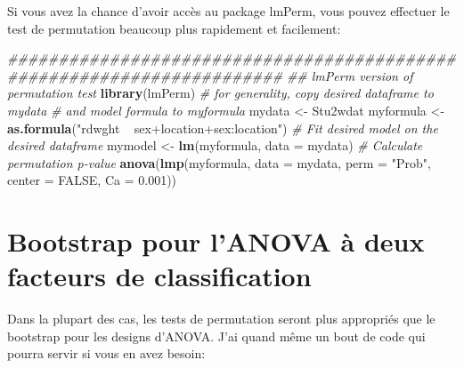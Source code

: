 \documentclass[12pt,]{book}
\newenvironment{Shaded}{\begin{snugshade}}{\end{snugshade}}
\newcommand{\CommentTok}[1]{\textcolor[rgb]{0.56,0.35,0.01}{\textit{#1}}}
\newcommand{\DataTypeTok}[1]{\textcolor[rgb]{0.13,0.29,0.53}{#1}}
\newcommand{\FloatTok}[1]{\textcolor[rgb]{0.00,0.00,0.81}{#1}}
\newcommand{\KeywordTok}[1]{\textcolor[rgb]{0.13,0.29,0.53}{\textbf{#1}}}
\newcommand{\NormalTok}[1]{#1}
\newcommand{\OtherTok}[1]{\textcolor[rgb]{0.56,0.35,0.01}{#1}}
\newcommand{\StringTok}[1]{\textcolor[rgb]{0.31,0.60,0.02}{#1}}
\begin{document}
Si vous avez la chance d'avoir accès au package lmPerm, vous pouvez effectuer le test de permutation beaucoup plus rapidement et facilement:

\begin{Shaded}
\begin{Highlighting}[]
\CommentTok{#######################################################################}
\CommentTok{## lmPerm version of permutation test}
\KeywordTok{library}\NormalTok{(lmPerm)}
\CommentTok{# for generality, copy desired dataframe to mydata}
\CommentTok{# and model formula to myformula}
\NormalTok{mydata <-}\StringTok{ }\NormalTok{Stu2wdat}
\NormalTok{myformula <-}\StringTok{ }\KeywordTok{as.formula}\NormalTok{(}\StringTok{"rdwght ~ sex+location+sex:location"}\NormalTok{)}
\CommentTok{# Fit desired model on the desired dataframe}
\NormalTok{mymodel <-}\StringTok{ }\KeywordTok{lm}\NormalTok{(myformula, }\DataTypeTok{data =}\NormalTok{ mydata)}
\CommentTok{# Calculate permutation p-value}
\KeywordTok{anova}\NormalTok{(}\KeywordTok{lmp}\NormalTok{(myformula, }\DataTypeTok{data =}\NormalTok{ mydata, }\DataTypeTok{perm =} \StringTok{"Prob"}\NormalTok{, }\DataTypeTok{center =} \OtherTok{FALSE}\NormalTok{, }\DataTypeTok{Ca =} \FloatTok{0.001}\NormalTok{))}
\end{Highlighting}
\end{Shaded}

\hypertarget{bootstrap-pour-lanova-uxe0-deux-facteurs-de-classification}{%
\section{Bootstrap pour l'ANOVA à deux facteurs de classification}\label{bootstrap-pour-lanova-uxe0-deux-facteurs-de-classification}}

Dans la plupart des cas, les tests de permutation seront plus appropriés que le bootstrap pour les designs d'ANOVA. J'ai quand même un bout de code qui pourra servir si vous en avez besoin:
\end{document}
